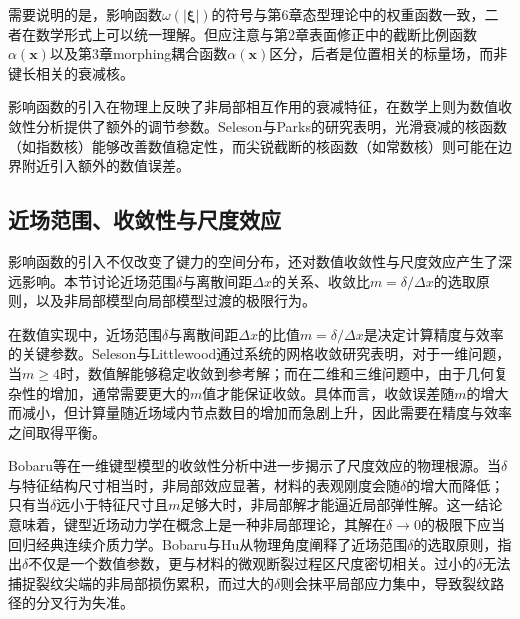 需要说明的是，影响函数$\omega(|\boldsymbol{\xi}|)$的符号与第6章态型理论中的权重函数一致，二者在数学形式上可以统一理解。但应注意与第2章表面修正中的截断比例函数$\alpha(\mathbf{x})$以及第3章morphing耦合函数$\alpha(\mathbf{x})$区分，后者是位置相关的标量场，而非键长相关的衰减核。

\begin{remark}
  影响函数的引入在物理上反映了非局部相互作用的衰减特征，在数学上则为数值收敛性分析提供了额外的调节参数。Seleson与Parks\cite{SelesonParks2011}的研究表明，光滑衰减的核函数（如指数核）能够改善数值稳定性，而尖锐截断的核函数（如常数核）则可能在边界附近引入额外的数值误差。
\end{remark}


\subsection{近场范围、收敛性与尺度效应}\label{sec:convergence-scaling}

影响函数的引入不仅改变了键力的空间分布，还对数值收敛性与尺度效应产生了深远影响。本节讨论近场范围$\delta$与离散间距$\Delta x$的关系、收敛比$m=\delta/\Delta x$的选取原则，以及非局部模型向局部模型过渡的极限行为。

在数值实现中，近场范围$\delta$与离散间距$\Delta x$的比值$m=\delta/\Delta x$是决定计算精度与效率的关键参数。Seleson与Littlewood\cite{SelesonLittlewood2016}通过系统的网格收敛研究表明，对于一维问题，当$m\ge 4$时，数值解能够稳定收敛到参考解；而在二维和三维问题中，由于几何复杂性的增加，通常需要更大的$m$值才能保证收敛。具体而言，收敛误差随$m$的增大而减小，但计算量随近场域内节点数目的增加而急剧上升，因此需要在精度与效率之间取得平衡。

Bobaru等\cite{Bobaru2009}在一维键型模型的收敛性分析中进一步揭示了尺度效应的物理根源。当$\delta$与特征结构尺寸相当时，非局部效应显著，材料的表观刚度会随$\delta$的增大而降低；只有当$\delta$远小于特征尺寸且$m$足够大时，非局部解才能逼近局部弹性解。这一结论意味着，键型近场动力学在概念上是一种非局部理论，其解在$\delta\to 0$的极限下应当回归经典连续介质力学。Bobaru与Hu\cite{BobaruHu2012}从物理角度阐释了近场范围$\delta$的选取原则，指出$\delta$不仅是一个数值参数，更与材料的微观断裂过程区尺度密切相关。过小的$\delta$无法捕捉裂纹尖端的非局部损伤累积，而过大的$\delta$则会抹平局部应力集中，导致裂纹路径的分叉行为失准。


